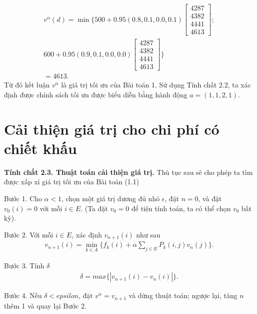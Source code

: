 \documentclass[12pt,a4paper]{report}
\begin{document}
    \begin{align*}
    v^\alpha(d)=\min\{500+0.95(0.8,0.1,0.0,0.1)
    \left[
    \begin{array}{c}
    4287\\
    4382\\
    4441\\
    4613
    \end{array}
    \right];\\
    600+0.95(0.9,0.1,0.0,0.0)  
    \left[
    \begin{array}{c}
    4287\\
    4382\\
    4441\\
    4613
    \end{array}
    \right]\}\\
    =4613.
    \end{align*}
    Từ đó kết luận $v^\alpha$ là giá trị tối ưu của Bài toán 1. Sử dụng Tính chất 2.2, ta xác định được chính sách tối ưu được biểu diễn bằng hành động $a=(1,1,2,1)$.
    
    \section{Cải thiện giá trị cho chi phí có chiết khấu}
 
 \begin{shaded*}
 \noindent
 \textbf{Tính chất 2.3. {Thuật toán cải thiện giá trị}.}
 \selectfont 
 Thủ tục sau sẽ cho phép ta tìm được xấp xỉ giá trị tối ưu của Bài toán (1.1)
 
 \medskip
 \noindent
 Bước 1. Cho $\alpha <1$, chọn một giá trị dương đủ nhỏ $\epsilon$, đặt $n=0$, và đặt $v_0(i)=0$ với mỗi $i \in E$. (Ta đặt $v_0 =0$ để tiện tính toán, ta có thể chọn $v_0$ bất kỳ).
 
 \medskip
 \noindent
 Bước 2. Với mỗi $i \in E$, xác định $v_{n+1}(i)$ như sau
 \begin{align*}
 v_{n+1}(i)=\underset{k \in A}{\min}\{f_k(i)+\alpha \sum_{j\in E} P_k(i,j)v_n(j)\}.
 \end{align*}
 
 \medskip
 \noindent
 Bước 3. Tính $\delta$
 \begin{align*}
 \delta=max\{|v_{n+1}(i)-v_{n}(i)|\}.
 \end{align*}
 
 \medskip
 \noindent
 Bước 4. Nếu $\delta<epsilon$, đặt $v^\alpha =v_{n+1}$ và dừng thuật toán; ngược lại, tăng $n$ thêm 1 và quay lại Bước 2.
 
 \end{shaded*}
   
\end{document}
